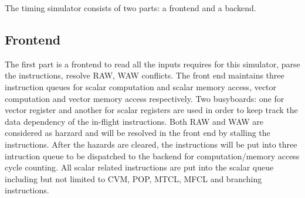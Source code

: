 \documentclass[conference]{IEEEtran}
\begin{document}
The timing simulator consists of two parts: a frontend and a backend. 

\subsection{Frontend}
The first part is a frontend to read all the inputs requires for this simulator, parse the instructions, resolve RAW, WAW conflicts. The front end maintains three instruction queues for scalar computation and scalar memory access, vector computation and vector memory access respectively. Two busyboards: one for vector register and another for scalar registers are used in order to keep track the data dependency of the in-flight instructions. Both RAW and WAW are considered as harzard and will be resolved in the front end by stalling the instructions. After the hazards are cleared, the instructions will be put into three intruction queue to be dispatched to the backend for computation/memory access cycle counting. All scalar related instructions are put into the scalar queue including but not limited to CVM, POP, MTCL, MFCL and branching instructions. 
\end{document}
